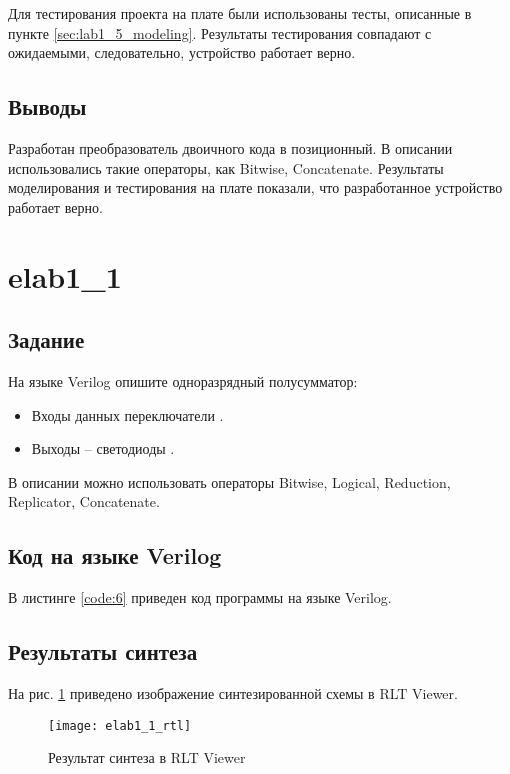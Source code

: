 Для тестирования проекта на плате были использованы тесты, описанные в пункте \ref{sec:lab1_5_modeling}. Результаты тестирования совпадают с ожидаемыми, следовательно, устройство работает верно.

\subsection{Выводы}

Разработан преобразователь двоичного кода в позиционный. В описании использовались такие операторы, как Bitwise, Concatenate. Результаты моделирования и тестирования на плате показали, что разработанное устройство работает верно.

\newpage

\section{elab1\_1}

\subsection{Задание}

На языке Verilog опишите одноразрядный полусумматор:
\begin{itemize}
	\item Входы данных переключатели .
	\item Выходы – светодиоды .
\end{itemize}
В описании можно использовать операторы Bitwise, Logical, Reduction, Replicator, Concatenate.

\subsection{Код на языке Verilog}

В листинге \ref{code:6} приведен код программы на языке Verilog.



\subsection{Результаты синтеза}

На рис. \ref{fig:elab1_1_rtl} приведено изображение синтезированной схемы в RLT Viewer.

\begin{figure}[H]
\begin{center}
	\texttt{[image: elab1\_1\_rtl]}
	\caption{Результат синтеза в RLT Viewer}
	\label{fig:elab1_1_rtl}
\end{center}
\end{figure}

